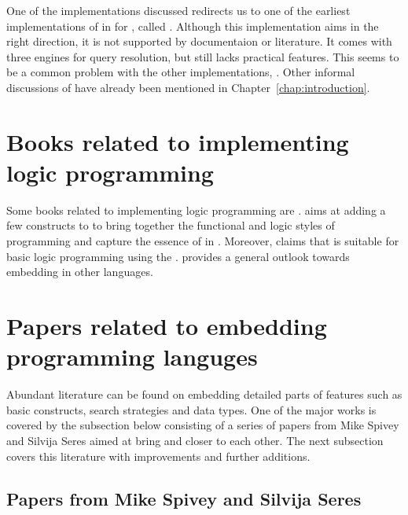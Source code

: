 \documentclass[thesis-solanki.tex]{subfiles}
\begin{document}
One of the implementations discussed redirects us to one of the earliest implementations of  in
 for , called  
\cite{website:mini-prolog-hugs98}.
Although this implementation aims in the right direction, it is not supported by documentaion or literature.
It comes with three engines for query resolution, but still lacks practical  features.
This seems to be a common problem with the other implementations, \cite{website:takashi-workplace}.
Other informal discussions of  have already been mentioned in Chapter~\ref{chap:introduction}.

\section{Books related to implementing logic programming}

Some books related to implementing logic programming are
\cite{friedman05reasoned,website:logicprogexamplehaskell,krishnamurthi2007programming}.
\cite{friedman05reasoned} aims at adding a few constructs to  to bring together the functional and
logic styles of programming and capture the essence of  in .
Moreover, \cite{website:logicprogexamplehaskell} claims that  is suitable for basic logic
programming using the .
\cite{krishnamurthi2007programming} provides a general outlook towards embedding  in other
languages.

\section{Papers related to embedding programming languges}

Abundant literature can be found on embedding detailed parts of  features such as basic
constructs, search strategies and data types.
One of the major works is covered by the subsection below consisting of a series of papers from Mike Spivey and
Silvija Seres aimed at bring  and  closer to each other.
The next subsection covers this literature with improvements and further additions.


\subsection{Papers from Mike Spivey and Silvija Seres}
\end{document}
